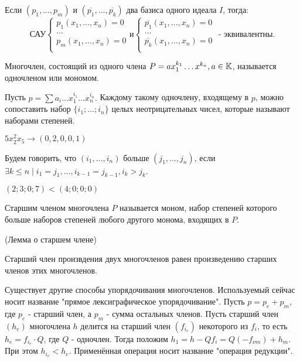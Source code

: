 \utv Если $(p_1,\ldots,p_m)$ и $(\overline{p_1},\ldots,\overline{p_k})$ два базиса одного идеала $I$, тогда:
\begin{equation*}
	\text{САУ}
	\begin{cases}
	   	p_1(x_1,\ldots,x_n) = 0\\
		\ldots\\
	   	p_m(x_1,\ldots,x_n) = 0\\
	\end{cases}
\text{и}
	\begin{cases}
	   	\overline{p_1}(x_1,\ldots,x_n) = 0\\
		\ldots\\
	   	\overline{p_k}(x_1,\ldots,x_n) = 0\\
	\end{cases}
\text{ - эквивалентны.}
\end{equation*}

\opr Многочлен, состоящий из одного члена $P = ax_1^{k_1}\ldots x^{k_n}, a \in \mathbb{K}$, называется одночленом или мономом.

Пусть $p = \sum a_i\ldots x_1^{i_1}\ldots x_n^{i_n}.$ Каждому такому одночлену, входящему в $p$, можно сопоставить набор $\{i_1;\ldots;i_n\}$  целых неотрицательных чисел, которые называют наборами степеней.

\example $5x_2^2x_5 \rightarrow (0,2,0,0,1)$

\opr Будем говорить, что $(i_1,\ldots,i_n)$ больше $(j_1,\ldots,j_n)$, если $\exists k \le n \mid i_1 = j_1, \ldots, i_{k-1} = j_{k-1},i_k > j_k$.

\example $(2;3;0;7) < (4;0;0;0)$

\opr Старшим членом многочлена $P$ называется моном, набор степеней которого больше наборов степеней любого другого монома, входящих в $P$.

\lem (Лемма о старшем члене)

Старший член произвдения двух многочленов равен произведению старших членов этих многочленов.

\note Существует другие способы упорядочивания многочленов. Используемый сейчас носит название "прямое лексиграфическое упорядочивание". Пусть $p = p_e + p_m$, где $p_e$ - старший член, а  $p_m$ - сумма остальных членов. Пусть старший член $(h_e)$ многочлена $h$ делится на старший член $(f_{i_e})$ некоторого из $f_i$, то есть $h_e = f_{i_e} \cdot Q$, где $Q$ - одночлен. Тогда положим $h_1 = h - Qf_i = Q(-f_{\nu m}) + h_m$. При этом $h_{i_e} < h_e$. Применённая операция носит название "операция редукции".

